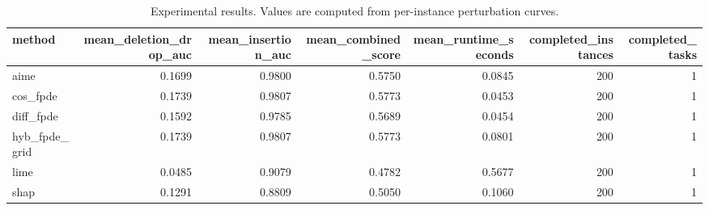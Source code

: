 \begin{table}[t]
\caption{Experimental results. Values are computed from per-instance perturbation curves.}
\label{tab:main_results_computed}
\centering
\begin{tabular}{lrrrrrr}
\toprule
method & mean\_deletion\_drop\_auc & mean\_insertion\_auc & mean\_combined\_score & mean\_runtime\_seconds & completed\_instances & completed\_tasks \\
\midrule
aime & 0.1699 & 0.9800 & 0.5750 & 0.0845 & 200 & 1 \\
cos\_fpde & 0.1739 & 0.9807 & 0.5773 & 0.0453 & 200 & 1 \\
diff\_fpde & 0.1592 & 0.9785 & 0.5689 & 0.0454 & 200 & 1 \\
hyb\_fpde\_grid & 0.1739 & 0.9807 & 0.5773 & 0.0801 & 200 & 1 \\
lime & 0.0485 & 0.9079 & 0.4782 & 0.5677 & 200 & 1 \\
shap & 0.1291 & 0.8809 & 0.5050 & 0.1060 & 200 & 1 \\
\bottomrule
\end{tabular}

\end{table}
